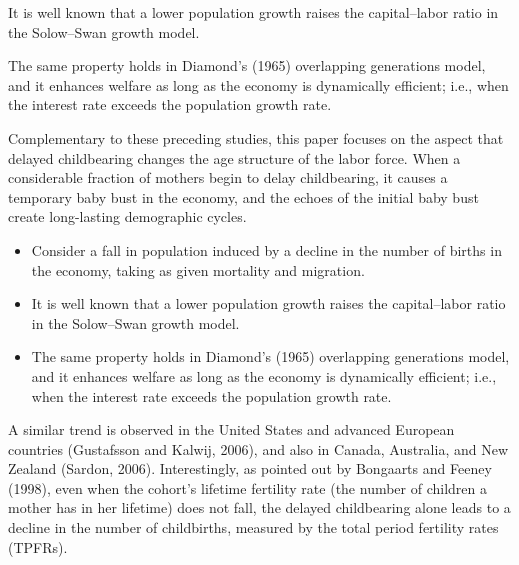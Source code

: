 \documentclass{MBE}%
\begin{document}
{\begin{arabiclist}
\item It is well known that a lower population growth raises the capital--labor ratio in the Solow--Swan
growth model.

\item The same property holds in Diamond's (1965) overlapping generations model, and it enhances welfare
as long as the economy is dynamically efficient; i.e., when the interest rate exceeds the
population growth rate.
\end{arabiclist}
Complementary to these preceding studies, this paper focuses on the aspect that delayed
childbearing changes the age structure of the labor force. When a considerable fraction of mothers
begin to delay childbearing, it causes a temporary baby bust in the economy, and the echoes of the
initial baby bust create long-lasting demographic cycles. %
\begin{itemize}
\item Consider a fall in population induced by a decline in the number of births in the economy,
taking as given mortality and migration.

\item It is well known that a lower population growth raises the capital--labor ratio in the Solow--Swan
growth model.

\item The same property holds in Diamond's (1965) overlapping generations model, and it enhances welfare
as long as the economy is dynamically efficient; i.e., when the interest rate exceeds the
population growth rate.
\end{itemize}
 A similar trend is observed in the United
States and advanced European countries (Gustafsson and Kalwij, 2006), and also in Canada,
Australia, and New Zealand (Sardon, 2006). Interestingly, as pointed out by Bongaarts and Feeney
(1998), even when the cohort's lifetime fertility rate (the number of children a mother has in her
lifetime) does not fall, the delayed childbearing alone leads to a decline in the number of
childbirths, measured by the total period fertility rates (TPFRs). %


}
\end{document}
